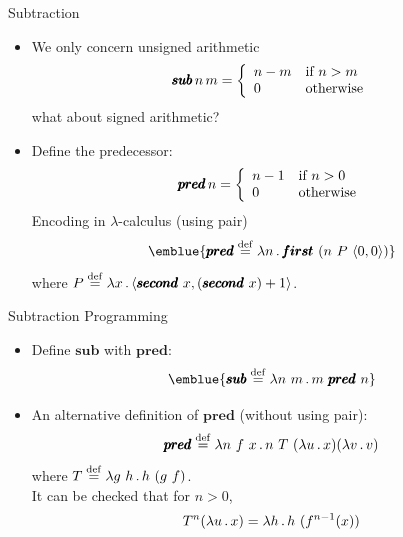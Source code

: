 \documentclass[paper=screen,mode=present,style=zysimple]{powerdot}
\begin{document}
\begin{slide}{Subtraction}
\begin{itemize}
\item We only concern unsigned arithmetic
 \[
\pmb{sub} \, n \, m = \left\{
\begin{array}{l@{\quad}l}
n - m & \mbox{if $n > m$} \\
0 & \mbox{otherwise}
\end{array}
\right .
\]
 what about signed arithmetic?
\item Define the predecessor: 
 \[
\pmb{pred} \, n = \left\{
\begin{array}{l@{\quad}l}
n - 1 & \mbox{if $n > 0$} \\
0 & \mbox{otherwise}
\end{array}
\right .
\]
Encoding in $\lambda$-calculus (using pair)
\[
\emblue{\pmb{pred} \defeq \lambda n \ldot \pmb{first} \ (n \ P \ \cpair{0, 0})}
\]
where $P \stackrel{\mathrm{def}}{=} \lambda x \, . \, \langle{\pmb{second} \ x, (\pmb{second} \ x) + 1}\rangle$. 
\end{itemize}
\end{slide}

\begin{slide}{Subtraction}
Programming 
\begin{itemize}
\item Define $\pmb{sub}$ with $\pmb{pred}$:
\[
\emblue{\pmb{sub}\defeq \lambda n \ m \ldot m \ \pmb{pred} \ n}
\vspace*{-2em}
\]
\item An alternative definition of $\pmb{pred}$ (without using pair):
\[
\pmb{pred} \stackrel{\mathrm{def}}{=} \lambda n \ f \ x \, . \, n \ T \ (\lambda u \, . \, x) (\lambda v \, . \, v) 
\]
where $T \stackrel{\mathrm{def}}{=} \lambda g \ h \, . \, h \ (g \ f)$.
\\
It can be checked that for $n > 0$, 
\[
T^n (\lambda u \, . \, x) = \lambda h \, . \, h \ (f^{n-1} (x))
\]
\end{itemize}
\end{slide}
\end{document}

